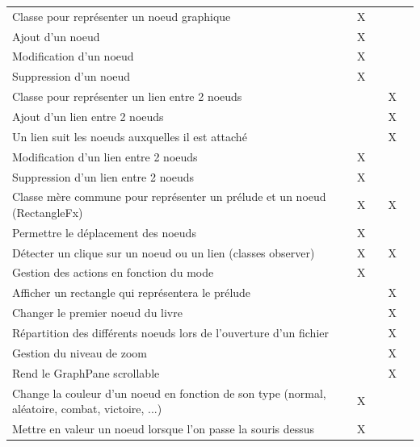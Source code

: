 \begin{centering}
\begin{longtable}{|p{8cm}|c|c|c|c|}
				\rowcolor{lightgray} \multicolumn{5}{|c|}{ \textbf{Zone d'édition}}\\
				\hline
				Classe pour représenter un noeud graphique & X & & & \\
				\hline
				Ajout d'un noeud & X & & & \\
				\hline
				Modification d'un noeud & X & & & \\
				\hline
				Suppression d'un noeud & X & & & \\
				\hline
				Classe pour représenter un lien entre 2 noeuds & & & X & \\
				\hline
				Ajout d'un lien entre 2 noeuds & & & X & \\
				\hline
				Un lien suit les noeuds auxquelles il est attaché & & & X & \\
				\hline
				Modification d'un lien entre 2 noeuds & X & & & \\
				\hline
				Suppression d'un lien entre 2 noeuds & X & & & \\
				\hline
				Classe mère commune pour représenter un prélude et un noeud (RectangleFx) & X & & X & \\
				\hline
				Permettre le déplacement des noeuds & X & & & \\
				\hline
				Détecter un clique sur un noeud ou un lien (classes observer) & X & & X & \\
				\hline
				Gestion des actions en fonction du mode & X & & & \\
				\hline
				Afficher un rectangle qui représentera le prélude & & & X & \\
				\hline
				Changer le premier noeud du livre & & & X & \\
				\hline
				Répartition des différents noeuds lors de l'ouverture d'un fichier & & & X & \\
				\hline
				Gestion du niveau de zoom & & & X & \\
				\hline
				Rend le GraphPane scrollable & & & X & \\
				\hline
				Change la couleur d'un noeud en fonction de son type (normal, aléatoire, combat, victoire, ...) & X & & & \\
				\hline
				Mettre en valeur un noeud lorsque l'on passe la souris dessus & X & & & \\
				\hline


\end{longtable}
\end{centering}

